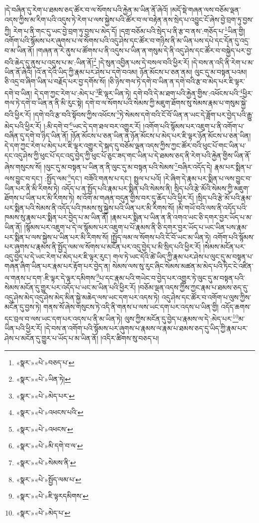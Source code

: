 །དེ་བཞིན་དུ་རེག་པ་ཐམས་ཅད་ཚོར་བ་ལ་སོགས་པའི་རྐྱེན་མ་ཡིན་ནོ་ཞེའོ། །མདོ་སྡེ་གཞན་ལས་བཅོམ་ལྡན་འདས་ཀྱིས་མ་རིག་པའི་འདུས་ཏེ་རེག་པ་ལས་སྐྱེས་པའི་ཚོར་བ་ལ་བརྟེན་ནས་སྲེད་པ་འབྱུང་ངོ་ཞེས་བྱེ་བྲག་ཏུ་བྱས་ཀྱི། རེག་པ་ནི་གང་དུ་ཡང་བྱེ་བྲག་ཏུ་བྱས་པ་མེད་དོ། །དགྲ་བཅོམ་པའི་སྲེད་པ་ནི་རྩ་བ་ནས་:གཅོད་པ་\footnote{«སྣར་»«པེ་»བཅད་པ་}ཡིན་གྱི། འགོག་པའི་སྙོམས་པར་ཞུགས་པ་ལ་སོགས་པའི་འདུ་ཤེས་དང་ཚོར་བ་གཉིས་ནི་མ་ཡིན་པས་དཔེ་དང་དོན་དུ་འདྲ་བ་མ་ཡིན་ནོ། །གཞན་ན་རེ་ནུས་པ་ཚོགས་པ་ནི་འདུས་པ་ཡིན་ན་གསུམ་དེ་ནི་འདུ་ཤེས་དང་ཚོར་བ་བསྐྱེད་པར་བྱ་བའི་ཆེད་དུ་ནུས་པ་འདུས་པ་མ་:ཡིན་ནོ།\footnote{«སྣར་»«པེ་»ཡིན་ཏེ།} །དེ་སུན་འབྱིན་པས་དེ་བསལ་བའི་ཕྱིར་རོ། །དེ་བས་ན་འདི་ནི་རེག་པ་མ་ཡིན་ནོ་ཞེའོ། །འོ་ན་དེའི་ཡིད་ཀྱི་རྣམ་པར་ཤེས་པ་དགེ་བའམ། ཉོན་མོངས་པ་ཅན་ནམ། ལུང་དུ་མ་བསྟན་པའམ། ཅི་འདྲ་བ་ཞིག་ཡིན་པ་བརྗོད་པར་བྱ་དགོས་སོ། །ཅི་ཉེས་གལ་ཏེ་དགེ་བ་ཡིན་ན་དགེ་བའི་རྩ་བ་མེད་པར་ཇི་ལྟར་དགེ་བ་ཡིན། དེ་དག་ཀྱང་རེག་པ་:མེད་པ་\footnote{«སྣར་»«པེ་»མེད་པར་}ཇི་ལྟར་ཡིན་ཏེ། དགེ་བའི་དེ་མ་ཐག་པའི་རྐྱེན་གྱིས་:འཕོངས་པའི་\footnote{«སྣར་»«པེ་»འཕངས་པའི་}ཕྱིར་གལ་ཏེ་དགེ་བ་ཡིན་ན་ནི་མི་རུང་སྟེ། དགེ་བ་ལ་སོགས་པའི་སེམས་ཀྱི་མཇུག་ཐོགས་སུ་སེམས་རྣམ་པ་གསུམ་སྐྱེ་བའི་ཕྱིར་རོ། །དགེ་བའི་རྩ་བའི་སྟོབས་ཀྱིས་འཕོངས་\footnote{«སྣར་»«པེ་»འཕངས་}ཏེ་སེམས་དགེ་བའི་ངོ་བོ་ཡིན་ན་ཡང་དེ་ཟློག་པར་བྱེད་པའི་རྒྱུ་མེད་པའི་ཕྱིར་རོ། །:མི་དགེ་བ་\footnote{«སྣར་»«པེ་»མི་དགེ་བ་ལ་}ཡང་དེ་དག་ཐལ་བར་འགྱུར་རོ། །འགོག་པའི་སྙོམས་པར་འཇུག་པ་ནི་འགོག་པ་བཞིན་དུ་དགེ་བ་ཉིད་ཡིན་ནོ། །ཉོན་མོངས་པ་ཅན་ཡིན་ན་ཉོན་མོངས་པ་མེད་པར་ཇི་ལྟར་ཉོན་མོངས་པ་ཅན་ཡིན། དེ་དག་ཀྱང་རེག་པ་མེད་པར་ཇི་ལྟར་འགྱུར་དེ་སྐད་དུ་བཅོམ་ལྡན་འདས་ཀྱིས་ཀྱང་ཚོར་བའི་ཕུང་པོ་གང་ཡིན་པ་དང་འདུ་ཤེས་ཀྱི་ཕུང་པོ་དང་འདུ་བྱེད་ཀྱི་ཕུང་པོ་ཅུང་ཟད་གང་ཡིན་པ་དེ་ཐམས་ཅད་ནི་རེག་པའི་རྐྱེན་གྱིས་ཡིན་ནོ་ཞེས་གསུངས་སོ། །ལུང་དུ་མ་བསྟན་པ་ཡིན་ན་ནི་ལུང་དུ་མ་བསྟན་པའི་སེམས་\footnote{«སྣར་»«པེ་»སེམས་ནི་}བཞིར་འདོད་དེ། རྣམ་པར་སྨིན་པ་ལས་བྱུང་བ་དང་། :སྤྱོད་ལམ་\footnote{«སྣར་»«པེ་»སྤྱོད་ལམ་པ་}དང་། བཟོའི་གནས་པ་དང་། སྤྲུལ་པ་པའོ། །རེ་ཞིག་དེ་རྣམ་པར་སྨིན་པ་ལས་བྱུང་བ་ཡིན་པར་ནི་མི་རིགས་ཏེ། འདོད་པ་ན་སྤྱོད་པའི་རྣམ་པར་སྨིན་པའི་སེམས་ནི། སྲིད་པའི་རྩེ་མོའི་སེམས་ཀྱི་མཇུག་ཐོགས་པ་ཡིན་པར་མི་རིགས་ཏེ། ས་འོག་མ་གཞན་བདུན་གྱིས་བར་དུ་ཆོད་པའི་ཕྱིར་རོ། །སྲིད་པའི་རྩེ་མོ་པའི་རྣམ་པར་སྨིན་པའི་སེམས་ནི་འདོད་པའི་ཁམས་སུ་སྐྱེས་པའི་ཡིན་པར་མི་རིགས་སོ། །མི་གཡོ་བའི་ལས་ནི་འདོད་པའི་ཁམས་སུ་རྣམ་པར་སྨིན་པར་བྱེད་པ་མ་ཡིན་ནོ། །རྣམ་པར་སྨིན་པ་ཡིན་ན་ནི་འགའ་ཡང་ཅི་དགར་བྱར་ཡོད་པ་མ་ཡིན་ནོ། །སྙོམས་པར་འཇུག་པ་དེ་ལ་སྙོམས་པར་འཇུག་པ་པོ་རྣམས་ནི་ཅི་དགར་བྱར་ཡོད་པ་ཡང་ཡིན་པས་རྣམ་པར་སྨིན་པ་ལས་སྐྱེས་པ་ཡིན་པར་མི་རིགས་སོ། །སྤྱོད་ལམ་ལ་སོགས་པའི་ངོ་བོ་ཡང་མ་ཡིན་ཏེ། འགོག་པའི་སྙོམས་པར་ཞུགས་པ་རྣམས་ནི་སྤྱོད་ལམ་ལ་སོགས་པ་མངོན་པར་འདུ་བྱེད་པ་མི་སྲིད་པའི་ཕྱིར་རོ། །སེམས་མངོན་པར་འདུ་བྱེད་པ་དེ་ཡང་རེག་པ་མེད་པར་ཇི་ལྟར་རུང་། གལ་ཏེ་ཡང་དེའི་ཚེ་ཡིད་ཀྱི་རྣམ་པར་ཤེས་པ་ལུང་དུ་མ་བསྟན་པ་གཞན་ཞིག་ཡིན་པར་རྣམ་པར་རྟོག་པར་བྱེད་ན། སེམས་ལས་སུ་རུང་ཞིང་སེམས་མཚན་མ་མེད་པའི་ཏིང་ངེ་འཛིན་ལ་གནས་པ་དག་:ཇི་ལྟར་དེ་ལྟར་དམིགས་\footnote{«སྣར་»«པེ་»ཇི་ལྟརདམིགས་}པ་དང་རྣམ་པའི་གཡེང་བ་བྱེད་པར་འགྱུར་ཏེ་ལུང་དུ་མ་བསྟན་པའི་སེམས་མངོན་དུ་གྱུར་པར་འདོད་པ་ཡང་མ་ཡིན་པའི་ཕྱིར་རོ། །བཅོམ་ལྡན་འདས་ཀྱིས་ཀྱང་རྣམ་པ་ཐམས་ཅད་དུ་འདུ་ཤེས་མེད་འདུ་ཤེས་མེད་མིན་སྐྱེ་མཆེད་ལས་ཡང་དག་པར་འདས་ཏེ། འདུ་ཤེས་དང་ཚོར་བ་འགོག་པ་ལུས་ཀྱིས་མངོན་དུ་བྱས་ཏེ། གནས་སོ་ཞེས་གསུངས་ཏེ་འདི་ནི་གནས་པ་ལས་ཡང་དག་པར་འདས་པ་ཡིན་གྱི། འདོད་ཆགས་དང་བྲལ་བ་ལས་ཡང་དག་པར་འདས་པ་ནི་མ་ཡིན་ཏེ། ལུས་ཀྱིས་མངོན་དུ་བྱེད་པ་རྣམས་ལ་དེ་:མེད་པར་\footnote{«སྣར་»«པེ་»མེད་པ་}མ་ཡིན་པའི་ཕྱིར་རོ། །དེ་བས་ན་འགོག་པའི་སྙོམས་པར་ཞུགས་པ་རྣམས་ལ་རྣམ་པ་ཐམས་ཅད་དུ་ཡིད་ཀྱི་རྣམ་པར་ཤེས་པ་མངོན་དུ་གྱུར་པ་ཡོད་པ་མ་ཡིན་ནོ། །འདིར་ཚིགས་སུ་བཅད་པ། 